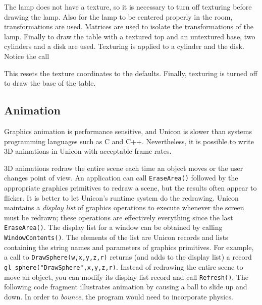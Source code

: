 The lamp does not have a texture, so it is necessary to turn off
texturing before drawing the lamp. Also for the lamp to be centered
properly in the room, transformations are used. Matrices are used to
isolate the transformations of the lamp. Finally to draw the table
with a textured top and an untextured base, two cylinders and a disk
are used. Texturing is applied to a cylinder and the disk.  Notice the
call


\noindent
This resets the texture coordinates to the defaults. Finally, texturing
is turned off to draw the base of the table.

\subsection{Animation}

Graphics animation is performance sensitive, and Unicon is slower than
systems programming languages such as C and C++. Nevertheless, it is
possible to write 3D animations in Unicon with acceptable frame rates.

3D animations redraw the entire scene each time an object moves or the
user changes point of view. An application can call
\texttt{EraseArea()} followed by the appropriate graphics primitives
to redraw a scene, but the results often appear to flicker. It is
better to let Unicon's runtime system do the redrawing. Unicon
maintains a \textit{display list} of graphics operations to execute
whenever the screen must be redrawn; these operations are effectively
everything since the last \texttt{EraseArea()}. The display list for a
window can be obtained by calling \texttt{WindowContents()}. The
elements of the list are Unicon records and lists containing the
string names and parameters of graphics primitives. For example, a
call to \texttt{DrawSphere(w,x,y,z,r)} returns (and adds to the
display list) a record \texttt{gl\_sphere("DrawSphere",x,y,z,r)}.
Instead of redrawing the entire scene to move an object, you can
modify its display list record and call \texttt{Refresh()}. The
following code fragment illustrates animation by causing a ball to
slide up and down.  In order to \textit{bounce}, the program would
need to incorporate physics.


